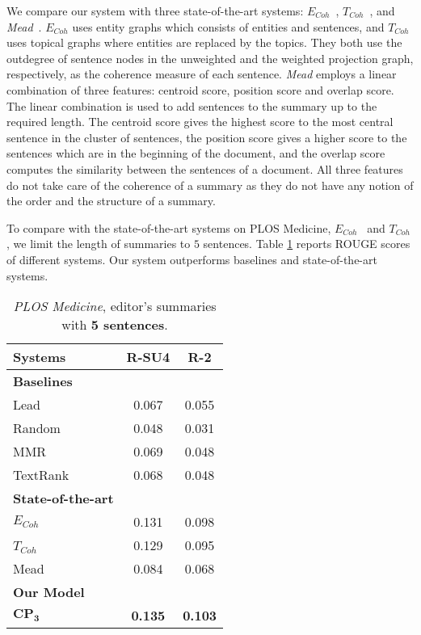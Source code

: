 We compare our system with three state-of-the-art systems: \emph{$E_{Coh}$}\ \cite{parveen15a}, \emph{$T_{Coh}$}\ \cite{parveen15b}, and \emph{Mead}\ \cite{radev04b}. \emph{$E_{Coh}$} uses entity graphs which consists of entities and sentences, and \emph{$T_{Coh}$} uses topical graphs where entities are replaced by the topics. They both use the outdegree of sentence nodes in the unweighted and the weighted projection graph, respectively, as the coherence measure of each sentence.  \emph{Mead} employs a linear combination of three features: centroid score, position score and overlap score. The linear combination is used to add sentences to the summary up to the required length. The centroid score gives the highest score to the most central sentence in the cluster of sentences, the position score gives a higher score to the sentences which are in the beginning of the document, and the overlap score computes the similarity between the sentences of a document. All three features do not take care of the coherence
of a summary as they do not have any notion of
the order and the structure of a summary.
                                                                                               

To compare with the state-of-the-art systems on PLOS Medicine, \emph{$E_{Coh}$}\ \cite{parveen15a} and \emph{$T_{Coh}$} \cite{parveen15b},
we limit the length of summaries to $5$ sentences. Table \ref{tab:plos_5len_editor} reports ROUGE scores of different systems.
Our system outperforms baselines and state-of-the-art systems.

\begin{table}[!ht]
\centering
\small
\begin{tabular}{@{}l|c|c@{}}
Systems & R-SU4 & R-2\\\hline
\textbf{Baselines}&  & \\
Lead & 0.067 &  0.055  \\
Random &  0.048  & 0.031  \\
MMR & 0.069 &  0.048  \\
TextRank & 0.068  & 0.048  \\\hline
\textbf{State-of-the-art}&  & \\
$E_{Coh}$ & 0.131& 0.098 \\
$T_{Coh}$\ & 0.129 & 0.095  \\
Mead & 0.084 & 0.068 \\\hline
\textbf{Our Model} & & \\
$\mathbf{CP_3}$ & \textbf{0.135} & \textbf{0.103} \\
\hline
\end{tabular}
\caption{\emph{PLOS Medicine}, editor's summaries with \textbf{5 sentences}.}
\label{tab:plos_5len_editor}
\end{table}

